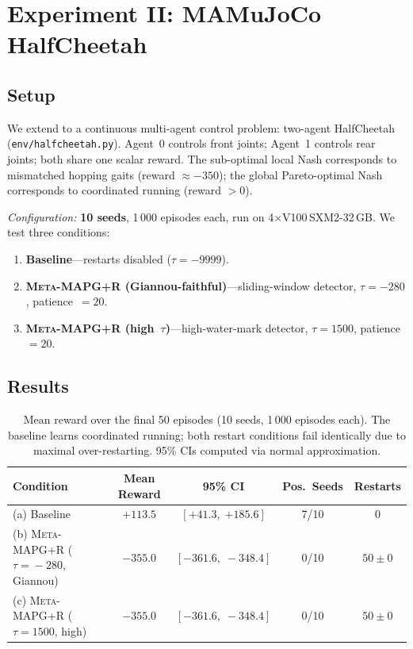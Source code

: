 \documentclass[11pt,a4paper]{article}
\newcommand{\OUR}{\textsc{Meta-MAPG+R}}
\newcommand{\repo}[1]{\texttt{\small #1}}
\theoremstyle{remark}
\begin{document}
\section{Experiment II: MAMuJoCo HalfCheetah}
\label{sec:mujoco}

\subsection{Setup}

We extend to a continuous multi-agent control problem:
two-agent HalfCheetah (\repo{env/halfcheetah.py}).
Agent~0 controls front joints; Agent~1 controls rear joints; both share one
scalar reward.
The sub-optimal local Nash corresponds to mismatched hopping gaits
(reward $\approx -350$); the global Pareto-optimal Nash corresponds to
coordinated running (reward $>0$).

\noindent
\textit{Configuration:} \textbf{10 seeds}, 1\,000 episodes each,
run on 4$\times$V100\,SXM2-32\,GB.
We test three conditions:
\begin{enumerate}[label=(\alph*),itemsep=2pt]
  \item \textbf{Baseline}---restarts disabled ($\tau = -9999$).
  \item \textbf{\OUR{} (Giannou-faithful)}---sliding-window detector,
    $\tau=-280$, patience~$=20$.
  \item \textbf{\OUR{} (high~$\tau$)}---high-water-mark detector,
    $\tau=1500$, patience~$=20$.
\end{enumerate}

\subsection{Results}

\begin{table}[H]
  \centering
  \caption{%
    Mean reward over the final 50 episodes (10 seeds, 1\,000 episodes each).
    The baseline learns coordinated running; both restart conditions fail
    identically due to maximal over-restarting.
    95\% CIs computed via normal approximation.
  }
  \label{tab:mujoco}
  \setlength{\tabcolsep}{6pt}
  \begin{tabular}{lcccc}
    \toprule
    \textbf{Condition} & \textbf{Mean Reward} & \textbf{95\% CI} & \textbf{Pos.\ Seeds} & \textbf{Restarts} \\
    \midrule
    (a) Baseline                          & $+113.5$ & $[{+41.3},\; {+185.6}]$ & 7/10 & $0$ \\
    (b) \OUR{} ($\tau\!=\!-280$, Giannou) & $-355.0$ & $[-361.6,\; -348.4]$    & 0/10 & $50 \pm 0$ \\
    (c) \OUR{} ($\tau\!=\!1500$, high)    & $-355.0$ & $[-361.6,\; -348.4]$    & 0/10 & $50 \pm 0$ \\
    \bottomrule
  \end{tabular}
\end{table}
\end{document}
